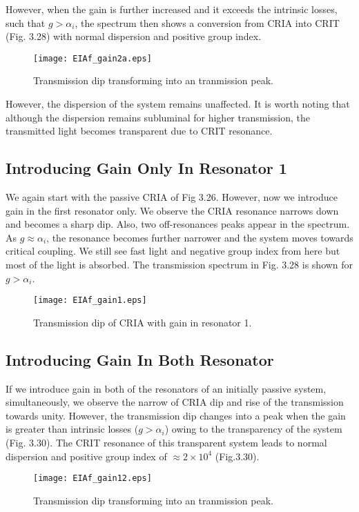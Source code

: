 However, when the gain is further increased and it exceeds the intrinsic losses, such that $g > \alpha_{i}$, the spectrum then shows a conversion from CRIA into CRIT (Fig. 3.28) with normal dispersion and positive group index.

\begin{figure}[h]
\centering
\texttt{[image: EIAf\_gain2a.eps]}
\caption{Transmission dip transforming into an tranmission peak.}
\end{figure}

However, the dispersion of the system remains unaffected. It is worth noting that although the dispersion remains subluminal for higher transmission, the transmitted light becomes transparent due to CRIT resonance.

\subsection{Introducing Gain Only In Resonator 1}
We again start with the passive CRIA of Fig 3.26. However, now we introduce gain in the first resonator only. We observe the CRIA resonance narrows down and becomes a sharp dip. Also, two off-resonances peaks appear in the spectrum. As $g \approx \alpha_{i}$, the resonance becomes further narrower and the system moves towards critical coupling. We still see fast light and negative group index from here but most of the light is absorbed. The transmission spectrum in Fig. 3.28 is shown for $g > \alpha_{i}$.

\begin{figure}[h]
\centering
\texttt{[image: EIAf\_gain1.eps]}
\caption{Transmission dip of CRIA with gain in resonator 1.}
\end{figure}

\subsection{Introducing Gain In Both Resonator}
If we introduce gain in both of the resonators of an initially passive system, simultaneously, we observe the narrow of CRIA dip and rise of the transmission towards unity. However, the transmission dip changes into a peak when the gain is greater than intrinsic losses ($g > \alpha_{i}$) owing to the transparency of the system (Fig. 3.30). The CRIT resonance of this transparent system leads to normal dispersion and positive group index of $\approx 2\times10^{4}$ (Fig.3.30).

\begin{figure}[h]
\centering
\texttt{[image: EIAf\_gain12.eps]}
\caption{Transmission dip transforming into an tranmission peak.}
\end{figure}

